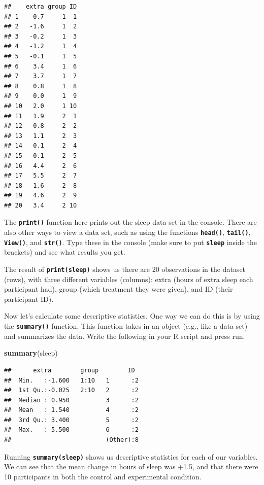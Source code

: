 \documentclass[
]{book}
\newenvironment{Shaded}{\begin{snugshade}}{\end{snugshade}}
\newcommand{\FunctionTok}[1]{\textcolor[rgb]{0.13,0.29,0.53}{\textbf{#1}}}
\newcommand{\NormalTok}[1]{#1}
\begin{document}
\begin{verbatim}
##    extra group ID
## 1    0.7     1  1
## 2   -1.6     1  2
## 3   -0.2     1  3
## 4   -1.2     1  4
## 5   -0.1     1  5
## 6    3.4     1  6
## 7    3.7     1  7
## 8    0.8     1  8
## 9    0.0     1  9
## 10   2.0     1 10
## 11   1.9     2  1
## 12   0.8     2  2
## 13   1.1     2  3
## 14   0.1     2  4
## 15  -0.1     2  5
## 16   4.4     2  6
## 17   5.5     2  7
## 18   1.6     2  8
## 19   4.6     2  9
## 20   3.4     2 10
\end{verbatim}

The \textbf{\texttt{print()}} function here prints out the sleep data set in the console. There are also other ways to view a data set, such as using the functions \textbf{\texttt{head()}}, \textbf{\texttt{tail()}}, \textbf{\texttt{View()}}, and \textbf{\texttt{str()}}. Type these in the console (make sure to put \textbf{\texttt{sleep}} inside the brackets) and see what results you get.

The result of \textbf{\texttt{print(sleep)}} shows us there are 20 observations in the dataset (rows), with three different variables (columns): extra (hours of extra sleep each participant had), group (which treatment they were given), and ID (their participant ID).

Now let's calculate some descriptive statistics. One way we can do this is by using the \textbf{\texttt{summary()}} function. This function takes in an object (e.g., like a data set) and summarizes the data. Write the following in your R script and press run.

\begin{Shaded}
\begin{Highlighting}[]
\FunctionTok{summary}\NormalTok{(sleep) }
\end{Highlighting}
\end{Shaded}

\begin{verbatim}
##      extra        group        ID   
##  Min.   :-1.600   1:10   1      :2  
##  1st Qu.:-0.025   2:10   2      :2  
##  Median : 0.950          3      :2  
##  Mean   : 1.540          4      :2  
##  3rd Qu.: 3.400          5      :2  
##  Max.   : 5.500          6      :2  
##                          (Other):8
\end{verbatim}

Running \textbf{\texttt{summary(sleep)}} shows us descriptive statistics for each of our variables. We can see that the mean change in hours of sleep was +1.5, and that there were 10 participants in both the control and experimental condition.
\end{document}
